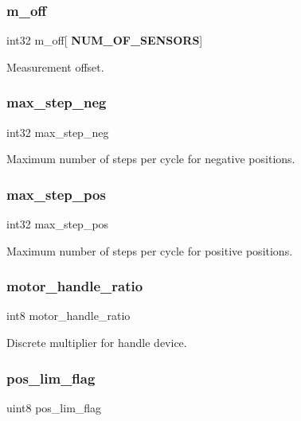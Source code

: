 \subsubsection{m\+\_\+off}
{\footnotesize\ttfamily int32 m\+\_\+off[\textbf{ N\+U\+M\+\_\+\+O\+F\+\_\+\+S\+E\+N\+S\+O\+RS}]}

Measurement offset. \mbox{\label{structst__mem_a14fe3ed96d232dced2d33efc493a0667}} 
\subsubsection{max\+\_\+step\+\_\+neg}
{\footnotesize\ttfamily int32 max\+\_\+step\+\_\+neg}

Maximum number of steps per cycle for negative positions. \mbox{\label{structst__mem_a9be5987152b8c6bb28c1d311bc94e5e3}} 
\subsubsection{max\+\_\+step\+\_\+pos}
{\footnotesize\ttfamily int32 max\+\_\+step\+\_\+pos}

Maximum number of steps per cycle for positive positions. \mbox{\label{structst__mem_a098badbb74d31ea6257e57f6d66823cc}} 
\subsubsection{motor\+\_\+handle\+\_\+ratio}
{\footnotesize\ttfamily int8 motor\+\_\+handle\+\_\+ratio}

Discrete multiplier for handle device. \mbox{\label{structst__mem_aa2ceebf7546e978c8b0393ce8035532d}} 
\subsubsection{pos\+\_\+lim\+\_\+flag}
{\footnotesize\ttfamily uint8 pos\+\_\+lim\+\_\+flag}

